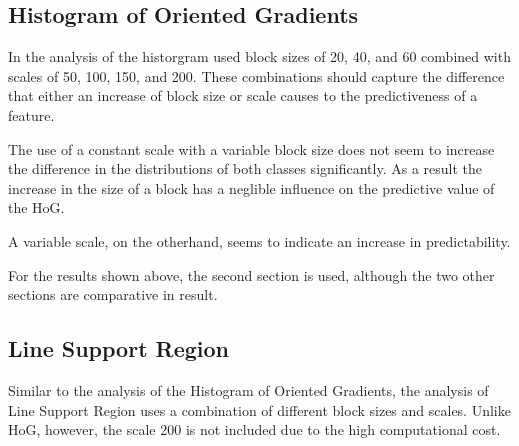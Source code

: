 

\subsection{Histogram of Oriented Gradients}

In the analysis of the historgram used block sizes of 20, 40, and 60 combined
with scales of 50, 100, 150, and 200. These combinations should capture the
difference that either an increase of block size or scale causes to the
predictiveness of a feature. 

The use of a constant scale with a variable block size does not seem to
increase the difference in the distributions of both classes significantly. As
a result the increase in the size of a block has a neglible influence on the
predictive value of the HoG.

A variable scale, on the otherhand, seems to indicate an increase in
predictability.


For the results shown above, the second section is used, although
the two other sections are comparative in result.

\subsection{Line Support Region}

Similar to the analysis of the Histogram of Oriented Gradients, the analysis of
Line Support Region uses a combination of different block sizes and scales.
Unlike HoG, however, the scale 200 is not included due to the high
computational cost. 

